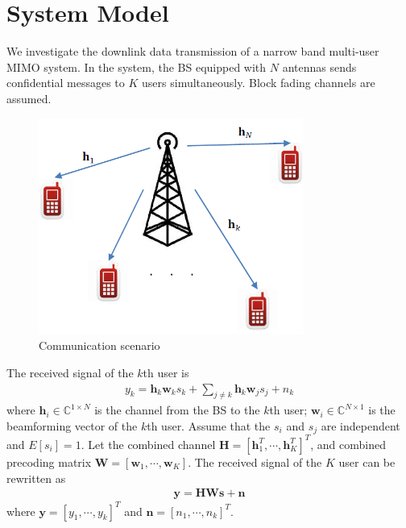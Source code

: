 \documentclass[12pt,journal,draftclsnofoot,onecolumn]{IEEEtran}
\begin{document}
\section{System Model} \label{sec:system model}
We investigate the downlink data transmission of a narrow band multi-user MIMO system. In the system, the BS equipped with $N$ antennas sends confidential messages to $K$ users simultaneously. 
Block fading channels are assumed.  
\begin{figure}[!htbp]
	\centering
	\includegraphics[width=8.7cm]{system.png} %
	\caption{Communication scenario}
	\label{fig:system}
\end{figure}

The received signal of the $k$th user is 
\begin{eqnarray}
y_k = \mathbf{h}_{k}\mathbf{w}_{k}s_k + \sum_{j \neq k}\mathbf{h}_k\mathbf{w}_js_j + n_k
\end{eqnarray}
where $\mathbf{h}_i \in \mathbb{C}^{1 \times N}$ is the channel from the BS to the $k$th user; $\mathbf{w}_i \in \mathbb{C}^{N \times 1}$ is the beamforming vector of the $k$th user. Assume that the $s_i$ and $s_j$ are independent and $E[s_i] = 1$. Let the combined channel $\mathbf{H} = [\mathbf{h}_1^T,\cdots,\mathbf{h}_K^T]^T$, and combined precoding matrix $\mathbf{W} = [\mathbf{w}_1,\cdots,\mathbf{w}_K]$. The received signal of the $K$ user can be rewritten as
\begin{eqnarray}
\mathbf{y} = \mathbf{H}\mathbf{W}\mathbf{s} + \mathbf{n}
\end{eqnarray}
where $\mathbf{y} = [y_1,\cdots,y_k]^T$ and $\mathbf{n} = [n_1,\cdots,n_k]^T$.
\end{document}
